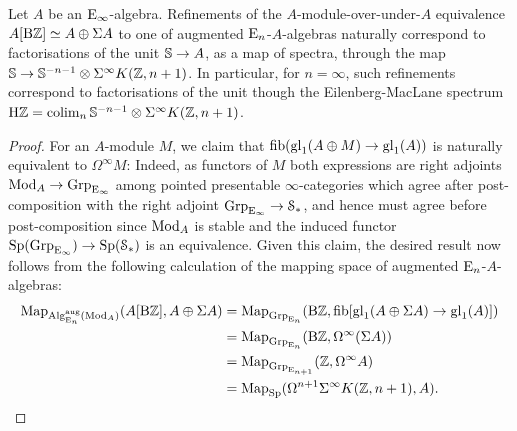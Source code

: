 \begin{lemma}
\label{lemma:sq0}%
Let $A$ be an ${\mathrm{E}_{\infty}}$-algebra. Refinements of the $A$-module-over-under-$A$ equivalence $A[\mathrm{B}\mathbb{Z}] \simeq A \oplus \Sigma A$ to one of augmented  
${\mathrm{E}_{n}}$-$A$-algebras naturally correspond to factorisations of the unit $\mathbb{S} \to A$,
as a map of spectra, 
through the map $\mathbb{S} \to \mathbb{S}^{-n-1}\otimes\Sigma^{\infty}K(\mathbb{Z},n+1)$. In particular, for $n=\infty$, such refinements correspond to factorisations of the unit though the Eilenberg-MacLane spectrum $\mathrm{H} \mathbb{Z} = \mathop{\mathrm{colim}}_n\mathbb{S}^{-n-1}\otimes\Sigma^{\infty}K(\mathbb{Z},n+1)$.
\end{lemma}
\begin{proof}
For an $A$-module $M$, we claim that $\operatorname{fib}(\mathrm{gl}_1(A\oplus M) \to \mathrm{gl}_1(A))$ is naturally equivalent to $\Omega^\infty M$: Indeed, as functors of $M$ both expressions are right adjoints $\operatorname{Mod}_A \to \operatorname{Grp}_{{\mathrm{E}_{\infty}}}$ among pointed presentable $\infty$-categories which agree after post-composition with the right adjoint $\operatorname{Grp}_{{\mathrm{E}_{\infty}}} \to \mathcal S_*$, and hence must agree before post-composition since $\operatorname{Mod}_A$ is stable and the induced functor $\mathrm{Sp}(\operatorname{Grp}_{{\mathrm{E}_{\infty}}}) \to \mathrm{Sp}(\mathcal S_*)$ is an equivalence.
Given this claim, the desired result now follows from the following calculation of the mapping space of augmented ${\mathrm{E}_{n}}$-$A$-algebras:
\begin{align*}
\operatorname{Map}_{\mathrm{Alg}^{\mathrm{aug}}_{{\mathrm{E}_{n}}}(\operatorname{Mod}_A)}(A[\mathrm{B}\mathbb{Z}],A\oplus \Sigma A) &= \operatorname{Map}_{\operatorname{Grp}_{{\mathrm{E}_{n}}}}(\mathrm{B}\mathbb{Z},\operatorname{fib}[\mathrm{gl}_1(A\oplus \Sigma A) \to \mathrm{gl}_1(A)]) \\
&= \operatorname{Map}_{\operatorname{Grp}_{{\mathrm{E}_{n}}}}(\mathrm{B}\mathbb{Z},\Omega^{\infty}(\Sigma A))\\
&= \operatorname{Map}_{\operatorname{Grp}_{{\mathrm{E}_{n+1}}}}(\mathbb{Z},\Omega^\infty A) \\
&= \operatorname{Map}_{\mathrm{Sp}}(\Omega^{n+1}\Sigma^{\infty}K(\mathbb{Z},n+1),A).\qedhere
\end{align*}
\end{proof}

